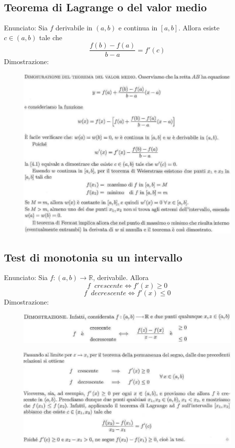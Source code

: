 \documentclass[a4paper, 9pt]{report}
\begin{document}
\subsection*{Teorema di Lagrange o del valor medio}
Enunciato:\newline
Sia $f$ derivabile in $(a,b)$ e continua in $[a,b]$. Allora esiste $c \in (a,b)$ tale che 
\[
    \frac{f(b)-f(a)}{b-a}= f'(c)
\]
Dimostrazione:\newline
\begin{figure}[h!]
    \includegraphics[width=\linewidth]{../dim/lagrange.PNG}
\end{figure}
\newpage
\subsection*{Test di monotonia su un intervallo}
Enunciato:\newline
Sia $f:(a,b) \rightarrow \mathbb{R}$, derivabile. Allora
\[
    f \;\; crescente \Leftrightarrow f'(x)\geq 0
\]
\[
    f \;\; decrescente \Leftrightarrow f'(x) \leq 0
\]
Dimostrazione:\newline
\begin{figure}[h!]
    \includegraphics[width=\linewidth]{../dim/monotonia1.PNG}
\end{figure}
\newline\begin{figure}[h!]
    \includegraphics[width=\linewidth]{../dim/monotonia2.PNG}
\end{figure}
\newpage
\end{document}
